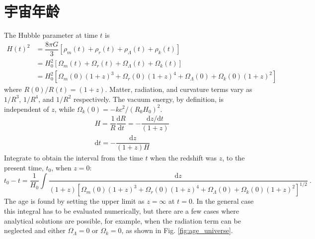 \documentclass[12pt,a4paper]{article}
\newcommand{\dif}{\mathrm{d}}
\begin{document}
\section{宇宙年龄}
\cite{perkins2008particle} The Hubble parameter at time $t$ is
\begin{align}
\nonumber H(t)^2 &= \dfrac{8\pi G}{3} \left[\rho_m(t) +\rho_r(t) +\rho_\Lambda(t) +\rho_k(t) \right] \\
\nonumber &= H_0^2 [\Omega_m(t) +\Omega_r(t) +\Omega_\Lambda(t)+\Omega_k(t)] \\
&= H_0^2[\Omega_m(0)(1+z)^3 +\Omega_r(0)(1+z)^4 +\Omega_\Lambda(0)+\Omega_k(0)(1+z)^2] 
\end{align}
where $R(0)/R(t) = (1 + z)$. Matter, radiation, and curvature terms vary as $1/R^3$, $1/R^4$, and $1/R^2$ respectively. The vacuum energy, by definition, is independent of $z$, while $\Omega_k(0) = -kc^2/(R_0H_0)^2$. 
\begin{align}
& H = \dfrac{1}{R} \dfrac{\dif R}{\dif t} = - \dfrac{\dif z/\dif t}{(1+z)} \\
& \dif t = -\dfrac{\dif z}{(1+z) H}
\end{align}
Integrate to obtain the interval from the time $t$ when the redshift was $z$, to the present time, $t_0$, when $z = 0$:
\begin{equation}
t_0 -t = \dfrac{1}{H_0} \int \dfrac{\dif z}{(1+z) [\Omega_m(0)(1+z)^3 +\Omega_r(0)(1+z)^4 +\Omega_\Lambda(0)+\Omega_k(0)(1+z)^2]^{1/2} } ~.
\end{equation}
The age is found by setting the upper limit as $z = \infty$ at $t = 0$. In the general case this integral has to be evaluated numerically, but there are a few cases where analytical solutions are possible, for example, when the radiation term can be neglected and either $\Omega_\Lambda = 0$ or $\Omega_k = 0$, as shown in Fig. \ref{fig:age_universe}.
\end{document}
